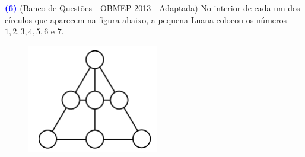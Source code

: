 \documentclass[12pt, a4paper]{article}
\begin{document}
\textcolor{blue}{\bf(6)} (Banco de Questões - OBMEP 2013 - Adaptada) No interior de cada um dos círculos que aparecem na figura abaixo, a pequena Luana colocou os números $1,2,3,4,5,6$ e $7.$
\begin{figure}[!h]
    \centering
    \includegraphics{Listas do PIC/5encontro1ciclo1.png}
\end{figure}
\end{document}
